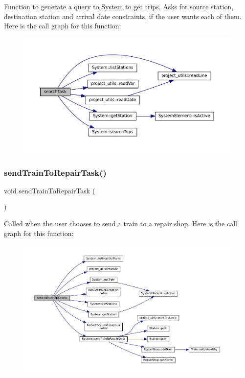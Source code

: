 Function to generate a query to \mbox{\hyperlink{classSystem}{System}} to get trips. Asks for source station, destination station and arrival date constraints, if the user wants each of them. Here is the call graph for this function\+:
\nopagebreak
\begin{figure}[H]
\begin{center}
\leavevmode
\includegraphics[width=350pt]{Train-System_8cpp_aa304a31243db94cf775bdf5014252981_cgraph}
\end{center}
\end{figure}
\mbox{\label{Train-System_8cpp_ae888f32c12e785a350ad1feb2c6b7f50}} 
\subsubsection{\texorpdfstring{send\+Train\+To\+Repair\+Task()}{sendTrainToRepairTask()}}
{\footnotesize\ttfamily void send\+Train\+To\+Repair\+Task (\begin{DoxyParamCaption}{ }\end{DoxyParamCaption})}

Called when the user chooses to send a train to a repair shop. Here is the call graph for this function\+:
\nopagebreak
\begin{figure}[H]
\begin{center}
\leavevmode
\includegraphics[width=350pt]{Train-System_8cpp_ae888f32c12e785a350ad1feb2c6b7f50_cgraph}
\end{center}
\end{figure}
